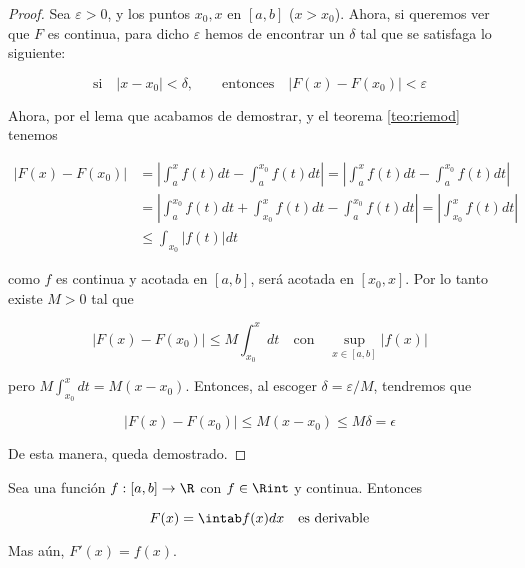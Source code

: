 \begin{proof}
    Sea $\varepsilon > 0$, y los puntos $x_0, x$ en $[a,b]$ ($x > x_0$). Ahora, si queremos ver que $F$ es continua, para dicho $\varepsilon$ hemos de encontrar un $\delta$ tal que se satisfaga lo siguiente:
    
    \[
    \text{si} \quad |x - x_0| < \delta, \qquad \text{entonces} \quad |F(x) - F(x_0)| < \varepsilon
    \]
    
    Ahora, por el lema que acabamos de demostrar, y el teorema \ref{teo:riemod} tenemos
    
    \begin{align*}
        |F(x) - F(x_0)| &= \left| \int_a^x f(t)dt - \int_a^{x_0} f(t)dt \right| = \left| \int_a^x f(t)dt - \int_a^{x_0} f(t)dt \right| \\
        &= \left| \int_a^{x_0} f(t)dt + \int_{x_0}^x f(t)dt - \int_a^{x_0} f(t)dt \right| = \left| \int_{x_0}^x f(t)dt \right| \\
        &\leq \int_{x_0} |f(t)|dt
    \end{align*}
    
    \noindent como $f$ es continua y acotada en $[a,b]$, será acotada en $[x_0, x]$. Por lo tanto existe $M > 0$ tal que
    
    \[
    |F(x) - F(x_0)| \leq M\int_{x_0}^xdt \quad \text{con} \quad \sup_{x\in[a,b]} |f(x)|
    \]
    
    \noindent pero $M\int_{x_0}^xdt = M(x-x_0)$. Entonces, al escoger $\delta = \varepsilon/M$, tendremos que
    
    \[
    |F(x) - F(x_0)| \leq M(x-x_0) \leq M\delta = \epsilon
    \]
    
    De esta manera, queda demostrado.
\end{proof}

\begin{teo}\label{teo:1TFC}
    Sea una función $f: [a,b] \rightarrow \R$ con $f \in \Rint$ y continua. Entonces
    
    \[
    F(x) = \intab f(x)dx \quad \text{es derivable}
    \]
    
    Mas aún, $F'(x) = f(x)$.
\end{teo}

